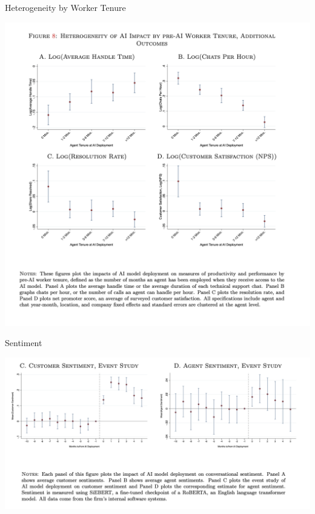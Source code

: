 \documentclass{beamer}
\begin{document}
\begin{frame}{Heterogeneity by Worker Tenure}
\begin{center}
\includegraphics[scale=0.35]{./lecture_includes/brynn7}
\end{center}
\end{frame}



\begin{frame}{Sentiment}
\begin{center}
\includegraphics[scale=0.35]{./lecture_includes/brynn8}
\end{center}
\end{frame}
\end{document}
